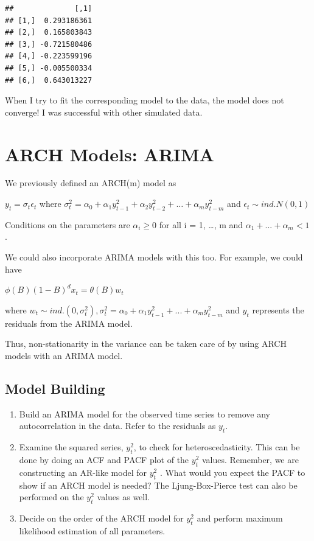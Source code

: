 \documentclass[
]{book}
\theoremstyle{definition}
\theoremstyle{definition}
\theoremstyle{definition}
\theoremstyle{definition}
\theoremstyle{remark}
\begin{document}
\begin{verbatim}
##              [,1]
## [1,]  0.293186361
## [2,]  0.165803843
## [3,] -0.721580486
## [4,] -0.223599196
## [5,] -0.005500334
## [6,]  0.643013227
\end{verbatim}

When I try to fit the corresponding model to the data, the model does not converge! I was successful with other simulated data.

\hypertarget{arch-models-arima}{%
\section{ARCH Models: ARIMA}\label{arch-models-arima}}

We previously defined an ARCH(m) model as

\(y_t = \sigma_t\epsilon_t\) where \(\sigma_t^2= \alpha_0 + \alpha_1y^2_{t-1} + \alpha_2y^2_{t-2} +…+ \alpha_my^2_{t-m}\) and \(\epsilon_t \sim ind. N(0,1)\)

Conditions on the parameters are \(\alpha_i \ge 0\) for all i = 1, \ldots, m and \(\alpha_1 + ... + \alpha_m < 1\).

We could also incorporate ARIMA models with this too. For example, we could have

\(\phi(B)(1-B)^dx_t=\theta(B)w_t\)

where \(w_t\sim ind.(0, \sigma_t^2), \sigma_t^2=\alpha_0+\alpha_1y^2_{t-1}+...+\alpha_my^2_{t-m}\) and \(y_t\) represents the residuals from the ARIMA model.

Thus, non-stationarity in the variance can be taken care of by using ARCH models with an ARIMA model.

\hypertarget{model-building}{%
\subsection{Model Building}\label{model-building}}

\begin{enumerate}
\def\labelenumi{\arabic{enumi}.}
\item
  Build an ARIMA model for the observed time series to remove any autocorrelation in the data. Refer to the residuals as \(y_t\).
\item
  Examine the squared series, \(y_t^2\), to check for heteroscedasticity. This can be done by doing an ACF and PACF plot of the \(y_t^2\) values. Remember, we are constructing an AR-like model for \(y_t^2\) . What would you expect the PACF to show if an ARCH model is needed? The Ljung-Box-Pierce test can also be performed on the \(y_t^2\) values as well.
\item
  Decide on the order of the ARCH model for \(y_t^2\) and perform maximum likelihood estimation of all parameters.
\end{enumerate}
\end{document}
